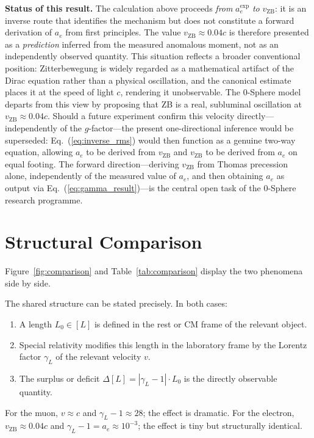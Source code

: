\documentclass[%
 reprint, amsmath,amssymb, aps, prb, ]{revtex4-2}
\numberwithin{equation}{section}
\newcommand{\vZB}{v_{\text{ZB}}}
\newcommand{\aexp}{a_{e}^{\text{exp}}}
\newcommand{\gammaL}{\gamma_{L}}
\begin{document}
\textbf{Status of this result.} The calculation above proceeds \emph{from} $\aexp$ \emph{to} $\vZB$: it is an inverse route that identifies the mechanism but does not constitute a forward derivation of $a_e$ from first principles. The value $\vZB \approx 0.04c$ is therefore presented as a \emph{prediction} inferred from the measured anomalous moment, not as an independently observed quantity. This situation reflects a broader conventional position: Zitterbewegung is widely regarded as a mathematical artifact of the Dirac equation rather than a physical oscillation, and the canonical estimate places it at the speed of light $c$, rendering it unobservable. The 0-Sphere model departs from this view by proposing that ZB is a real, subluminal oscillation at $\vZB \approx 0.04c$. Should a future experiment confirm this velocity directly---independently of the $g$-factor---the present one-directional inference would be superseded: Eq.~(\ref{eq:inverse_rms}) would then function as a genuine two-way equation, allowing $a_e$ to be derived from $\vZB$ and $\vZB$ to be derived from $a_e$ on equal footing. The forward direction---deriving $\vZB$ from Thomas precession alone, independently of the measured value of $a_e$, and then obtaining $a_e$ as output via Eq.~(\ref{eq:gamma_result})---is the central open task of the 0-Sphere research programme.

\section{\label{sec:comparison}Structural Comparison}

Figure~\ref{fig:comparison} and Table~\ref{tab:comparison} display the two phenomena side by side.

The shared structure can be stated precisely. In both cases:
\begin{enumerate}[leftmargin=*, label=(\roman*)]
\item A length $L_0 \in [L]$ is defined in the rest or CM frame of the relevant object.
\item Special relativity modifies this length in the laboratory frame by the Lorentz factor $\gammaL$ of the relevant velocity $v$.
\item The surplus or deficit $\Delta[L] = |\gammaL - 1|\cdot L_0$ is the directly observable quantity.
\end{enumerate}
For the muon, $v \approx c$ and $\gammaL - 1 \approx 28$; the effect is dramatic. For the electron, $\vZB \approx 0.04c$ and $\gammaL - 1 = a_e \approx 10^{-3}$; the effect is tiny but structurally identical.
\end{document}
